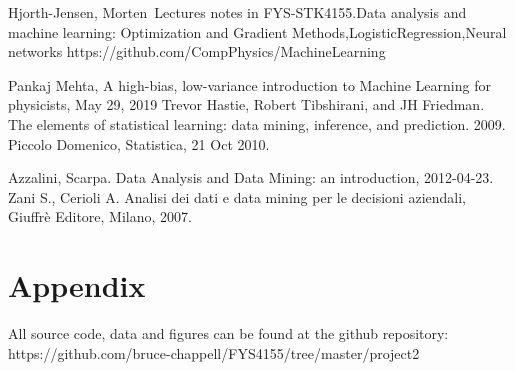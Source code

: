 \documentclass{emulateapj}
\begin{document}
\begin{thebibliography}{}
\bibitem{} Hjorth-Jensen, Morten \,Lectures notes in FYS-STK4155.Data analysis and
machine learning: Optimization   and   Gradient Methods,LogisticRegression,Neural   networks https://github.com/CompPhysics/MachineLearning

\bibitem {}Pankaj Mehta, A high-bias, low-variance introduction to Machine Learning for physicists, May 29, 2019
\bibitem {}Trevor Hastie, Robert Tibshirani, and JH Friedman. The elements of statistical learning: data
mining, inference, and prediction. 2009.
\bibitem{} Piccolo Domenico, Statistica, 21 Oct 2010.

\bibitem{}Azzalini, Scarpa. Data Analysis and Data Mining: an introduction, 2012-04-23.
Zani S., Cerioli A. Analisi dei dati e data mining per le decisioni aziendali, Giuffrè Editore, Milano, 2007.
\end{thebibliography}

\section{Appendix}
All source code, data and figures can be found at the github repository: https://github.com/bruce-chappell/FYS4155/tree/master/project2
\end{document}
